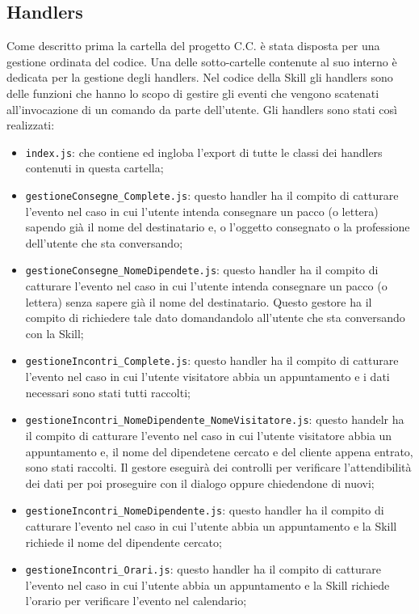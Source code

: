 \subsection{Handlers}
Come descritto prima la cartella del progetto C.C. è stata disposta per una gestione ordinata del codice. Una delle sotto-cartelle contenute al suo interno è dedicata per la gestione degli handlers. Nel codice della Skill gli handlers sono delle funzioni che hanno lo scopo di gestire gli eventi che vengono scatenati all'invocazione di un comando da parte dell'utente. Gli handlers sono stati così realizzati:
\begin{itemize}
    \item \texttt{index.js}: che contiene ed ingloba l'export di tutte le classi dei handlers contenuti in questa cartella;
    
    \item \texttt{gestioneConsegne\_Complete.js}: questo handler ha il compito di catturare l'evento nel caso in cui l'utente intenda consegnare un pacco (o lettera) sapendo già il nome del destinatario e, o l'oggetto consegnato o la professione dell'utente che sta conversando;
    \item \texttt{gestioneConsegne\_NomeDipendete.js}: questo handler ha il compito di catturare l'evento nel caso in cui l'utente intenda consegnare un pacco (o lettera) senza sapere già il nome del destinatario. Questo gestore ha il compito di richiedere tale dato domandandolo all'utente che sta conversando con la Skill;
    \item \texttt{gestioneIncontri\_Complete.js}: questo handler ha il compito di catturare l'evento nel caso in cui l'utente visitatore abbia un appuntamento e i dati necessari sono stati tutti raccolti;
    \item \texttt{gestioneIncontri\_NomeDipendente\_NomeVisitatore.js}: questo handelr ha il compito di catturare l'evento nel caso in cui l'utente visitatore abbia un appuntamento e, il nome del dipendetene cercato e del cliente appena entrato, sono stati raccolti. Il gestore eseguirà dei controlli per verificare l'attendibilità dei dati per poi proseguire con il dialogo oppure chiedendone di nuovi;
    \item \texttt{gestioneIncontri\_NomeDipendente.js}: questo handler ha il compito di catturare l'evento nel caso in cui l'utente abbia un appuntamento e la Skill richiede il nome del dipendente cercato;
    \item \texttt{gestioneIncontri\_Orari.js}: questo handler ha il compito di catturare l'evento nel caso in cui l'utente abbia un appuntamento e la Skill richiede l'orario per verificare l'evento nel calendario;

\end{itemize}
